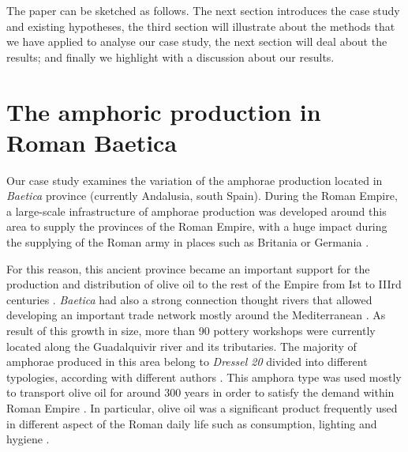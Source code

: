 \documentclass[review]{elsarticle}
\begin{document}
The paper can be sketched as follows. The next section introduces the case study and existing hypotheses, the third section will illustrate about the methods that we have applied to analyse our case study, the next section will deal about the results; and finally we highlight with a discussion about our results.  


\section{The amphoric production in Roman Baetica}

Our case study examines the variation of the amphorae production located in \emph{Baetica} province (currently Andalusia, south Spain). During the Roman Empire, a large-scale infrastructure of amphorae production was developed around this area to supply the provinces of the Roman Empire, with a huge impact during the supplying of the Roman army in places such as Britania \citep{funari_economic_2005, monfort_britannia_1998} or Germania \citep{remesal_annona_1986}. 

For this reason, this ancient province became an important support for the production and distribution of olive oil to the rest of the Empire from Ist to IIIrd centuries \citep{chic2005comercio, millet_anforas_1998, rodriguez_baetican_1998}. \emph{Baetica} had also a strong connection thought rivers that allowed developing an important trade network mostly around the Mediterranean \citep{garcia_vargas_enrique_formal_2010}. As result of this growth in size, more than 90 pottery workshops were currently located along the Guadalquivir river and its tributaries. The majority of amphorae produced in this area belong to \emph{Dressel 20} divided into different typologies, according with different authors \citep{berni_millet_epigrafianforica_2008, martin-kilcher_romischen_1994}. 
This amphora type was used mostly to transport olive oil for around 300 years in order to satisfy the demand within Roman Empire \citep{rodriguez_economioleicola_1977}. In particular, olive oil was a significant product frequently used in different aspect of the Roman daily life such as consumption, lighting and hygiene \citep{mattingly_d.j._oil_1988}. 
\end{document}
